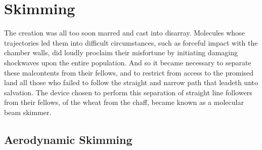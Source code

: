\ifx\justbeingincluded\undefined


\fi



\chapter{Skimming}
\label{chapter:skimming}

The creation was all too soon marred and cast into disarray.
Molecules whose trajectories led them into difficult circumstances, such as forceful impact with the chamber walls, did loudly proclaim their misfortune by initiating damaging shockwaves upon the entire population.
And so it became necessary to separate these malcontents from their fellows, and to restrict from access to the promised land all those who failed to follow the straight and narrow path that leadeth unto salvation.
The device chosen to perform this separation of straight line followers from their fellows, of the wheat from the chaff, became known as a molecular beam skimmer.

\section{Aerodynamic Skimming}


